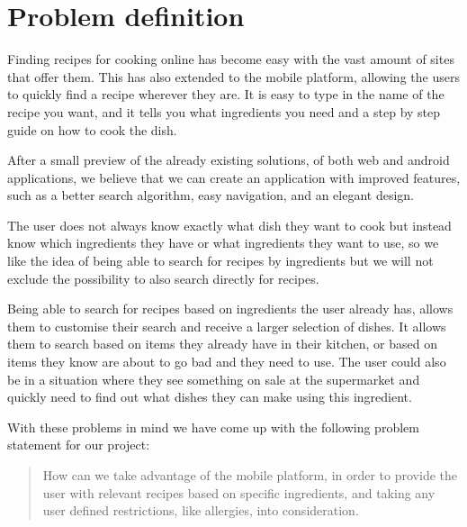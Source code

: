 \section{Problem definition}\label{sec:probdef}

Finding recipes for cooking online has become easy with the vast amount of sites that offer them. This has also extended to the mobile platform, allowing the users to quickly find a recipe wherever they are. It is easy to type in the name of the recipe you want, and it tells you what ingredients you need and a step by step guide on how to cook the dish.

After a small preview of the already existing solutions, of both web and android applications, we believe that we can create an application with improved features, such as a better search algorithm, easy navigation, and an elegant design. 

The user does not always know exactly what dish they want to cook but instead know which ingredients they have or what ingredients they want to use, so we like the idea of being able to search for recipes by ingredients but we will not exclude the possibility to also search directly for recipes. 

Being able to search for recipes based on ingredients the user already has, allows them to customise their search and receive a larger selection of dishes. It allows them to search based on items they already have in their kitchen, or based on items they know are about to go bad and they need to use. The user could also be in a situation where they see something on sale at the supermarket and quickly need to find out what dishes they can make using this ingredient.

With these problems in mind we have come up with the following problem statement for our project:

\begin{quote}
How can we take advantage of the mobile platform, in order to provide the user with relevant recipes based on specific ingredients, and taking any user defined restrictions, like allergies, into consideration.
\end{quote}